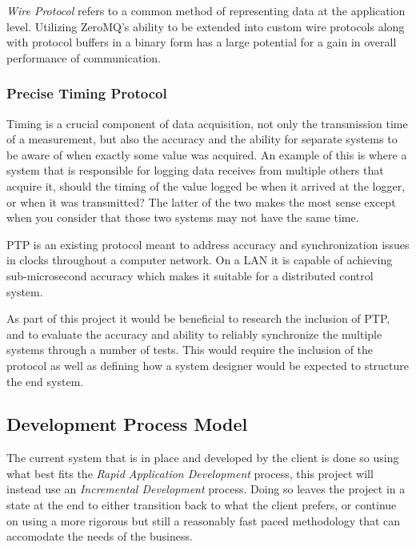 \documentclass[11pt]{article}
\begin{document}
        \emph{Wire Protocol} refers to a common method of representing data at
        the application level. Utilizing ZeroMQ's ability to be extended into
        custom wire protocols along with protocol buffers in a binary form has
        a large potential for a gain in overall performance of communication.

      \subsubsection{Precise Timing Protocol}\label{sec:soln-innov-ptp}

        Timing is a crucial component of data acquisition, not only the
        transmission time of a measurement, but also the accuracy and the
        ability for separate systems to be aware of when exactly some value
        was acquired. An example of this is where a system that is responsible
        for logging data receives from multiple others that acquire it, should
        the timing of the value logged be when it arrived at the logger, or
        when it was transmitted? The latter of the two makes the most sense
        except when you consider that those two systems may not have the same
        time.

        PTP is an existing protocol meant to address accuracy and
        synchronization issues in clocks throughout a computer network. On a
        LAN it is capable of achieving sub-microsecond accuracy which makes
        it suitable for a distributed control system.

        As part of this project it would be beneficial to research the
        inclusion of PTP, and to evaluate the accuracy and ability to reliably
        synchronize the multiple systems through a number of tests. This would
        require the inclusion of the protocol as well as defining how a system
        designer would be expected to structure the end system.

    \subsection{Development Process Model}\label{sec:soln-model}

      The current system that is in place and developed by the client is done
      so using what best fits the \emph{Rapid Application Development} process,
      this project will instead use an \emph{Incremental Development} process.
      Doing so leaves the project in a state at the end to either transition
      back to what the client prefers, or continue on using a more rigorous but
      still a reasonably fast paced methodology that can accomodate the needs
      of the business.
\end{document}
